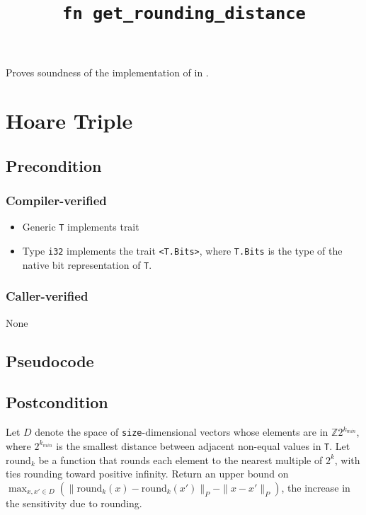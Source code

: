 \documentclass{article}
\title{\texttt{fn get\_rounding\_distance}}
\author{\MichaelShoemateAuthor}
\date{}
\begin{document}
\maketitle

\contrib
Proves soundness of the implementation of  in .

\section{Hoare Triple}
\subsection*{Precondition}
\subsubsection*{Compiler-verified}

\begin{itemize}
    \item Generic \texttt{T} implements trait 
    \item Type \texttt{i32} implements the trait \texttt{<T.Bits>},
        where \texttt{T.Bits} is the type of the native bit representation of \texttt{T}.
\end{itemize}

\subsubsection*{Caller-verified}
None

\subsection*{Pseudocode}


\subsection*{Postcondition}
\begin{theorem}
    Let $D$ denote the space of \texttt{size}-dimensional vectors whose elements are in $\mathbb{Z} 2^{k_{min}}$,
    where $2^{k_{min}}$ is the smallest distance between adjacent non-equal values in \texttt{T}.
    Let $\mathrm{round}_k$ be a function that rounds each element to the nearest multiple of $2^k$,
    with ties rounding toward positive infinity.
    Return an upper bound on $\max_{x, x' \in D} (\|\mathrm{round}_k(x) - \mathrm{round}_k(x')\|_P - \|x - x'\|_P)$,
    the increase in the sensitivity due to rounding.
\end{theorem}
\end{document}
